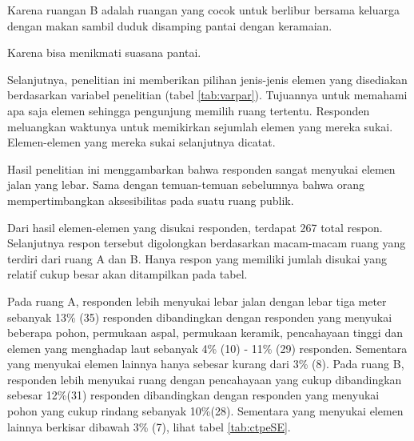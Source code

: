 \documentclass[11pt]{udthesis} %
\begin{document}
\begin{quoting}
   Karena ruangan B adalah ruangan yang cocok untuk berlibur bersama keluarga dengan makan sambil duduk disamping pantai dengan keramaian.
\end{quoting}

\begin{quoting}
    Karena bisa menikmati suasana pantai.
\end{quoting}

Selanjutnya, penelitian ini memberikan pilihan jenis-jenis elemen yang disediakan berdasarkan variabel penelitian (tabel \ref{tab:varpar}). Tujuannya untuk memahami apa saja elemen sehingga pengunjung memilih ruang tertentu. Responden meluangkan waktunya untuk memikirkan sejumlah elemen yang mereka sukai. Elemen-elemen yang mereka sukai selanjutnya dicatat.

Hasil penelitian ini menggambarkan bahwa responden sangat menyukai elemen jalan yang lebar. Sama dengan temuan-temuan sebelumnya bahwa orang mempertimbangkan aksesibilitas pada suatu ruang publik.

Dari hasil elemen-elemen yang disukai responden, terdapat 267 total respon. Selanjutnya respon tersebut digolongkan berdasarkan macam-macam ruang yang terdiri dari ruang A dan B. Hanya respon yang memiliki jumlah disukai yang relatif cukup besar akan ditampilkan pada tabel.

Pada ruang A, responden lebih menyukai lebar jalan dengan lebar tiga meter sebanyak 13\% (35) responden dibandingkan dengan responden yang menyukai beberapa pohon, permukaan aspal, permukaan keramik, pencahayaan tinggi dan elemen yang menghadap laut sebanyak 4\% (10) - 11\% (29) responden. Sementara yang menyukai elemen lainnya hanya sebesar kurang dari 3\% (8). Pada ruang B, responden lebih menyukai ruang dengan pencahayaan yang cukup dibandingkan sebesar 12\%(31) responden dibandingkan dengan responden yang menyukai pohon yang cukup rindang sebanyak 10\%(28). Sementara yang menyukai elemen lainnya berkisar dibawah 3\% (7), lihat tabel \ref{tab:ctpeSE}.
\end{document}
